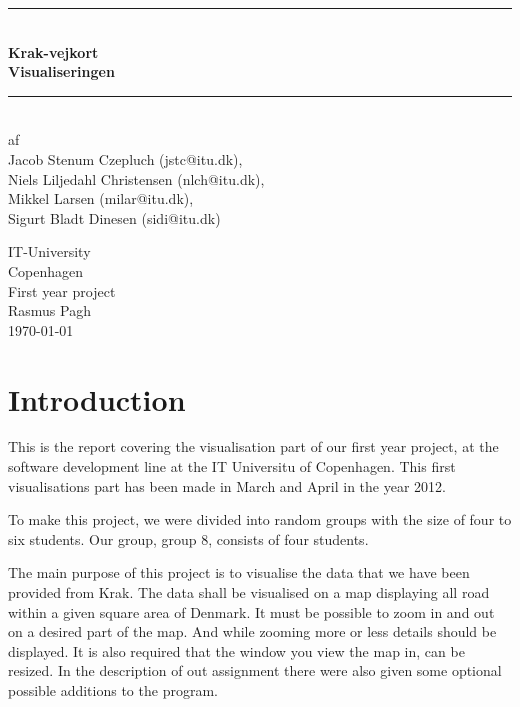\documentclass[a4paper,11pt]{article}
\begin{document}
\begin{titlepage}
\centering \parindent=0pt
\newcommand{\HRule}{\rule{\textwidth}{1mm}}
 \HRule\\[1cm]\Huge\bfseries
Krak-vejkort\\[0.7cm]
\large Visualiseringen\\[1cm]
\HRule\\[4cm]  \large af \\Jacob Stenum Czepluch (jstc@itu.dk), \\Niels Liljedahl Christensen (nlch@itu.dk), \\Mikkel Larsen (milar@itu.dk), \\Sigurt Bladt Dinesen (sidi@itu.dk) \\
 \normalsize %
\begin{flushleft}
IT-University\\
Copenhagen\\
First year project\\
Rasmus Pagh\\
\today \end{flushleft}
\end{titlepage}

\tableofcontents
\pagebreak

\pagebreak
\section{Introduction}

This is the report covering the visualisation part of our first year project, at the software development line at the IT Universitu of Copenhagen. This first visualisations part has been made in March and April in the year 2012. 

To make this project, we were divided into random groups with the size of four to six students. Our group, group 8, consists of four students. 

The main purpose of this project is to visualise the data that we have been provided from Krak. The data shall be visualised on a map displaying all road within a given square area of Denmark.
It must be possible to zoom in and out on a desired part of the map. And while zooming more or less details should be displayed. It is also required that the window you view the map in, can be resized. In the description of out assignment there were also given some optional possible additions to the program. 
\end{document}
